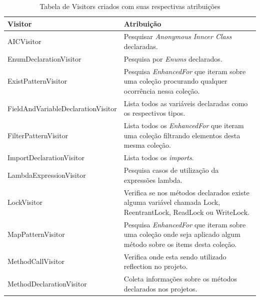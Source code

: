 \begin{table}[ht!] \footnotesize
	\centering
	\caption{Tabela de Visitors criados com suas respectivas atribuições}
	\label{tab:VisitorsCriados}	
    \begin{tabular}{ >{\arraybackslash}p{2.2in} | >{\arraybackslash}m{3.8in} }
			\hline 
			\textbf{Visitor} & \textbf{Atribuição}\\ \hline \hline
			
			AICVisitor & Pesquisar \textit{Anonymous Inncer Class} declaradas.\\ \hline
			
			EnumDeclarationVisitor 	& Pesquisa por \textit{Enums} declarados.\\ \hline
			
			ExistPatternVisitor	& Pesquisa \textit{EnhancedFor} que iteram sobre uma coleção procurando qualquer ocorrência nessa coleção.\\ \hline
			
			FieldAndVariableDeclarationVisitor & Lista todos as variáveis declaradas como os respectivos tipos.\\ \hline
			
			FilterPatternVisitor &  Lista todos os \textit{EnhancedFor} que iteram uma coleção filtrando elementos desta mesma coleção.\\ \hline
			
			ImportDeclarationVisitor & Lista todos os \textit{imports}.\\ \hline
			
			LambdaExpressionVisitor & Pesquisa casos de utilização da expressões lambda. \\ \hline
			
			LockVisitor & Verifica se nos métodos declarados existe alguma variável chamada Lock, ReentrantLock, ReadLock ou WriteLock. \\ \hline
			
			MapPatternVisitor & Pesquisa \textit{EnhancedFor} que iteram sobre uma coleção onde seja aplicado algum método sobre os items desta coleção. \\ \hline
			
			MethodCallVisitor & Verifica onde esta sendo utilizado reflection no projeto.\\ \hline
			
			MethodDeclarationVisitor & Coleta informações sobre os métodos declarados nos projetos. \\ \hline
			

\end{tabular}
\end{table}
